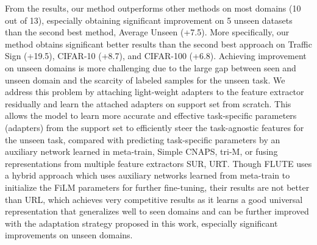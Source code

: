 From the results, our method outperforms other methods on most domains (10 out of 13), especially obtaining significant improvement on 5 unseen datasets than the second best method, \ie Average Unseen (+7.5). More specifically, our method obtains significant better results than the second best approach on Traffic Sign (+19.5), CIFAR-10 (+8.7), and CIFAR-100 (+6.8). 
Achieving improvement on unseen domains is more challenging due to the large gap between seen and unseen domain and the scarcity of labeled samples for the unseen task. 
We address this problem by attaching light-weight adapters to the feature extractor residually and learn the attached adapters on support set from scratch. 
This allows the model to learn more accurate and effective task-specific parameters (adapters) from the support set to efficiently steer the task-agnostic features for the unseen task, compared with predicting task-specific parameters by an auxiliary network learned in meta-train, \eg Simple CNAPS, tri-M, or fusing representations from multiple feature extractors \eg SUR, URT.
Though FLUTE uses a hybrid approach which uses auxiliary networks learned from meta-train to initialize the FiLM parameters for further fine-tuning, their results are not better than URL, 
which achieves very competitive results as it learns a good universal representation that generalizes well to seen domains and can be further improved with the adaptation strategy proposed in this work, especially significant improvements on unseen domains.



